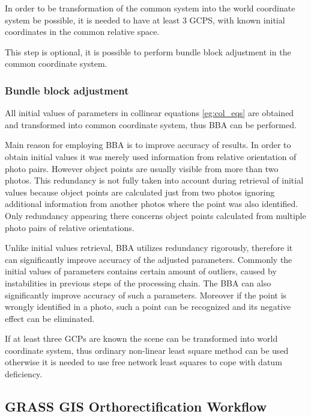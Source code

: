 \documentclass[a4paper,12pt]{article}
\begin{document}
In order to be transformation of the common system into the world coordinate system be possible, it is needed 
to have at least 3 GCPS, with known initial coordinates in the common relative space. 
 
This step is optional, it is possible to perform bundle block adjustment in the common coordinate system. 

\subsubsection{Bundle block adjustment}

All initial values of parameters in collinear equations \eqref{eg:col_eqs} are obtained and transformed into common coordinate system, thus 
BBA can be performed.

Main reason for employing BBA is to improve accuracy of results.
In order to obtain initial values it was merely used information from relative orientation of photo pairs.
However object points are usually visible from more than two photos. This redundancy is not fully taken 
into account during retrieval of initial values because object points are calculated just from two photos
ignoring additional information from another photos where the point was also identified.
Only redundancy appearing there concerns object points calculated from multiple photo pairs 
of relative orientations.  


Unlike initial values retrieval, BBA utilizes redundancy rigorously, therefore 
it can significantly improve accuracy of the adjusted parameters.
Commonly the initial values of parameters contains certain amount of outliers, caused by instabilities in previous steps of the processing chain.
The BBA can also significantly improve accuracy of such a parameters.
Moreover if the point is wrongly identified in a photo, such a point can be recognized and its 
negative effect can be eliminated.

If at least three GCPs are known the scene can be transformed into world coordinate system, thus ordinary non-linear least square method \label{sec:non_least} 
can be used otherwise
it is needed to use free network least squares \label{sec:free_net_least} to cope with datum deficiency. 

\subsection{GRASS GIS Orthorectification Workflow}
\end{document}
